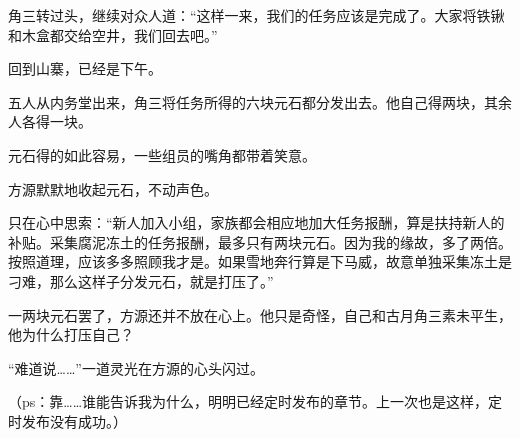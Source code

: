 \begin{this_body}
角三转过头，继续对众人道：“这样一来，我们的任务应该是完成了。大家将铁锹和木盒都交给空井，我们回去吧。”

回到山寨，已经是下午。

五人从内务堂出来，角三将任务所得的六块元石都分发出去。他自己得两块，其余人各得一块。

元石得的如此容易，一些组员的嘴角都带着笑意。

方源默默地收起元石，不动声色。

只在心中思索：“新人加入小组，家族都会相应地加大任务报酬，算是扶持新人的补贴。采集腐泥冻土的任务报酬，最多只有两块元石。因为我的缘故，多了两倍。按照道理，应该多多照顾我才是。如果雪地奔行算是下马威，故意单独采集冻土是刁难，那么这样子分发元石，就是打压了。”

一两块元石罢了，方源还并不放在心上。他只是奇怪，自己和古月角三素未平生，他为什么打压自己？

“难道说……”一道灵光在方源的心头闪过。

（ps：靠……谁能告诉我为什么，明明已经定时发布的章节。上一次也是这样，定时发布没有成功。）

\end{this_body}


